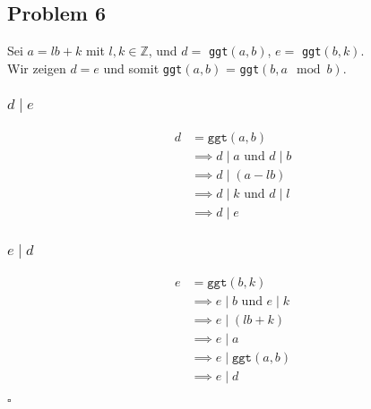 \documentclass[12pt, german]{article}
\newcommand{\bewiesen}{\begin{flushright}$\square$ \end{flushright} }
\begin{document}
    \subsection*{Problem 6}
 	Sei $a = lb + k$ mit $l,k \in \mathbb{Z}$, und $d=$ \texttt{ggt$(a,b)$}, $e=$ \texttt{ggt$(b,k)$}.\\ Wir zeigen $d = e$ und somit \texttt{ggt$(a,b)$} = \texttt{ggt$(b,a\mod b)$}. 
   \subsubsection*{$d \mid e$}
   \begin{align*}
   	d &= \texttt{ggt}(a,b) \\
   	&\implies d \mid a \text{ und } d \mid b \\
   	&\implies d \mid (a - lb) \\
   	&\implies d \mid k \text{ und } d \mid l \\
   	&\implies d \mid e
    \end{align*} 
  \subsubsection*{$e \mid d$}
    \begin{align*}
    	e &= \texttt{ggt}(b,k) \\
    		&\implies e \mid b \text{ und } e \mid k \\
    		&\implies e \mid  (lb +k) \\
    		&\implies e \mid a \\
    		&\implies e \mid \texttt{ggt}(a,b) \\
    		&\implies e \mid d
    \end{align*} 
    \bewiesen
    		
    
    
    
\end{document}
